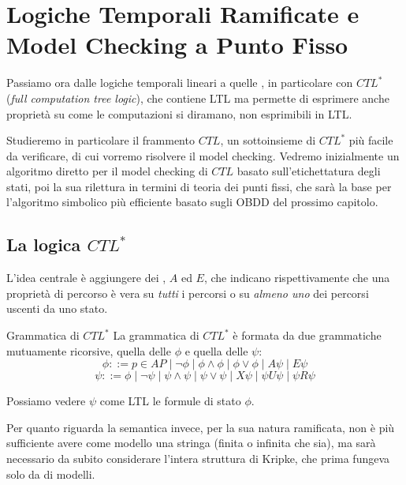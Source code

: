 \chapter{Logiche Temporali Ramificate e Model Checking a Punto Fisso}\label{ch:ctl}

Passiamo ora dalle logiche temporali lineari a quelle , in particolare con \(CTL^*\) (\textit{full computation tree logic}), che contiene LTL ma permette di esprimere anche proprietà su come le computazioni si diramano, non esprimibili in LTL\@.

Studieremo in particolare il frammento \(CTL\), un sottoinsieme di \(CTL^*\) più facile da verificare, di cui vorremo risolvere il model checking. Vedremo inizialmente un algoritmo diretto per il model checking di \(CTL\) basato sull'etichettatura degli stati, poi la sua rilettura in termini di teoria dei punti fissi, che sarà la base per l'algoritmo simbolico più efficiente basato sugli OBDD del prossimo capitolo.

\section{La logica \texorpdfstring{\(CTL^*\)}{CTL*}}

L'idea centrale è aggiungere dei , \(A\) ed \(E\), che indicano rispettivamente che una proprietà di percorso è vera su \emph{tutti} i percorsi o su \emph{almeno uno} dei percorsi uscenti da uno stato.

\begin{definition}{Grammatica di \(CTL^*\)}
  La grammatica di \(CTL^*\) è formata da due grammatiche mutuamente ricorsive, quella delle  \(\phi\) e quella delle  \(\psi\):
  \[\phi ::= p \in AP \mid \neg \phi \mid \phi \land \phi \mid \phi \lor \phi \mid A\psi \mid E\psi\]
  \[\psi ::= \phi \mid \neg \psi \mid \psi \land \psi \mid \psi \lor \psi \mid X\psi \mid \psi U\psi \mid \psi R\psi\]
\end{definition}

Possiamo vedere \(\psi\) come LTL  le formule di stato \(\phi\). 

Per quanto riguarda la semantica invece, per la sua natura ramificata, non è più sufficiente avere come modello una stringa (finita o infinita che sia), ma sarà necessario da subito considerare l'intera struttura di Kripke, che prima fungeva solo da  di modelli.

